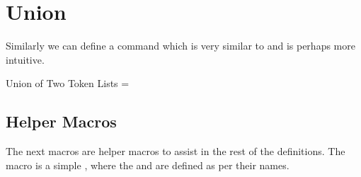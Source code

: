 \section{Union}
Similarly we can define a command \cmd{\Union} which is very similar to \cmd{\JoinToks} and is perhaps more intuitive.


\begin{texexample}{Union of Two Token Lists}{}
\def\Union(#1,#2){\expandafter\expandafter\expandafter
{\expandafter\the\expandafter#1\the#2}}
=\Union(,) 
\the{}
\end{texexample}





\subsection{Helper Macros}
The next macros are helper macros to assist in the rest of the definitions. The \cmd{\UpToHere} macro is a simple \cmd{\relax}, where the \cmd{\IgnoreRest} and \cmd{\IgnoreFirst} are defined as per their names.



\begin{teX}

%
\def\First#1{\expandafter\IgnoreRest\the#1{}\UpToHere}

%
\def\FirstOf#1{\expandafter\expandafter\expandafter
{\expandafter\IgnoreRest\the#1{}\UpToHere}}

%
\def\MoveFirst(#1to#2){#2=\FirstOf{#1}}

%
\def\Rest#1{\expandafter\IgnoreFirst\the#1\relax\UpToHere}

%
\def\RestOf#1{\expandafter\expandafter\expandafter
{\expandafter\IgnoreFirst\the#1\relax\UpToHere}}


\end{teX}

